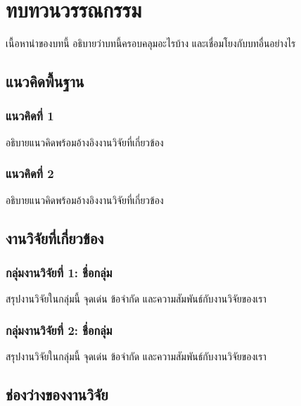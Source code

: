 \documentclass[10pt,a4paper]{report}
\begin{document}
\chapter{ทบทวนวรรณกรรม}

เนื้อหานำของบทนี้ อธิบายว่าบทนี้ครอบคลุมอะไรบ้าง
และเชื่อมโยงกับบทอื่นอย่างไร

\section{แนวคิดพื้นฐาน}

\subsection{แนวคิดที่ 1}

อธิบายแนวคิดพร้อมอ้างอิงงานวิจัยที่เกี่ยวข้อง

\subsection{แนวคิดที่ 2}

อธิบายแนวคิดพร้อมอ้างอิงงานวิจัยที่เกี่ยวข้อง

\section{งานวิจัยที่เกี่ยวข้อง}

\subsection{กลุ่มงานวิจัยที่ 1: ชื่อกลุ่ม}

สรุปงานวิจัยในกลุ่มนี้ จุดเด่น ข้อจำกัด
และความสัมพันธ์กับงานวิจัยของเรา

\subsection{กลุ่มงานวิจัยที่ 2: ชื่อกลุ่ม}

สรุปงานวิจัยในกลุ่มนี้ จุดเด่น ข้อจำกัด
และความสัมพันธ์กับงานวิจัยของเรา

\section{ช่องว่างของงานวิจัย}
\end{document}
